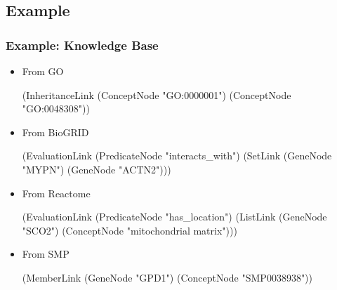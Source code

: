 \documentclass[aspectratio=169]{beamer}
\begin{document}
\subsection{Example}

\begin{frame}[fragile]
  \frametitle{Example: Knowledge Base}
  \begin{itemize}
  \item From GO
    {\tiny \begin{semiverbatim}
(InheritanceLink
  (ConceptNode "GO:0000001")
  (ConceptNode "GO:0048308"))
    \end{semiverbatim}}
  \item From BioGRID
    {\tiny \begin{semiverbatim}
(EvaluationLink
  (PredicateNode "interacts_with")
  (SetLink 
    (GeneNode "MYPN")
    (GeneNode "ACTN2")))
    \end{semiverbatim}}
  \item From Reactome
    {\tiny \begin{semiverbatim}
(EvaluationLink
  (PredicateNode "has_location")
  (ListLink
    (GeneNode "SCO2")
    (ConceptNode "mitochondrial matrix")))
    \end{semiverbatim}}
  \item From SMP
    {\tiny \begin{semiverbatim}
(MemberLink 
  (GeneNode "GPD1")
  (ConceptNode "SMP0038938"))
    \end{semiverbatim}}
  \end{itemize}
\end{frame}
\end{document}
